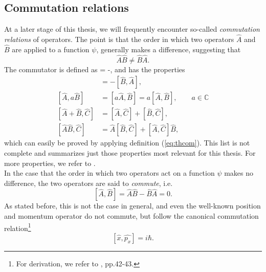 \subsection{Commutation relations}
At a later stage of this thesis, we will frequently encounter so-called \textit{commutation relations} of operators. The point is that the order in which two  operators $\hat{A}$ and $\hat{B}$ are applied to a function $\psi$, generally makes a difference, suggesting that
\[
\hat{A}\hat{B} \neq \hat{B}\hat{A}.
\]
The commutator is defined as
 = -,
\label{eq:thcom}
\ee
and has the properties
\begin{align*}
[\hat{A},\hat{B}] &= -[\hat{B},\hat{A}],\\
[\hat{A},a\hat{B}] &= [a\hat{A},\hat{B}] = a[\hat{A},\hat{B}], \qquad a\in\mathbb{C}\\
[\hat{A}+\hat{B},\hat{C}] &= [\hat{A},\hat{C}] + [\hat{B},\hat{C}],\\
[\hat{A}\hat{B},\hat{C}] &= \hat{A}[\hat{B},\hat{C}] + [\hat{A},\hat{C}]\hat{B},
\end{align*}
which can easily be proved by applying  definition (\ref{eq:thcom}). This list is not complete and summarizes just those properties most relevant for this thesis. For more properties, we refer to \cite{liboff1992introductory}.\\
In the case that the order in which two operators act on a function $\psi$ makes no difference, the two operators are said to \textit{commute}, i.e.
\[
[\hat{A},\hat{B}] = \hat{A}\hat{B}-\hat{B}\hat{A} = 0.
\]
As stated before, this is not the case in general, and even the well-known position and momentum operator do not commute, but follow the canonical commutation relation\footnote{For derivation, we refer to \cite{griffiths2005introduction}, pp.42-43.}
\[
[\hat{x},\hat{p_x}] = i\hbar.
\]

